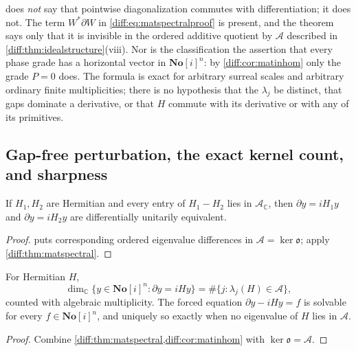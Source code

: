 \documentclass[11pt,letterpaper]{article}
\numberwithin{equation}{section}
\theoremstyle{definition}
\theoremstyle{remark}
\newcommand{\SC}{\mathbf{No}[i]}
\newcommand{\C}{\mathbb C}
\newcommand{\der}{\partial}
\newcommand{\Acl}{\mathcal A}
\newcommand{\Obs}{\mathfrak o}
\newcommand{\Ker}{\operatorname{ker}}
\begin{document}
\begin{warning}
\label{diff:warn:matconnection}
 does \emph{not} say that pointwise diagonalization
commutes with differentiation; it does not. The term $W^{*}\der W$ in
\cref{diff:eq:matspectralproof} is present, and the theorem says only that it
is invisible in the ordered additive quotient by $\Acl$ described in
\cref{diff:thm:idealstructure}(viii). Nor is the classification the assertion
that every phase grade has a horizontal vector in $\SC^{n}$: by
\cref{diff:cor:matinhom} only the grade $P=0$ does. The formula is exact for
arbitrary surreal scales and arbitrary ordinary finite multiplicities; there is
no hypothesis that the $\lambda_{j}$ be distinct, that gaps dominate a
derivative, or that $H$ commute with its derivative or with any of its
primitives.
\end{warning}

\subsection{Gap-free perturbation, the exact kernel count, and sharpness}
\label{diff:sub:matperturbation}

\begin{corollary}
\label{diff:cor:matperturbation}
If $H_{1},H_{2}$ are Hermitian and every entry of $H_{1}-H_{2}$ lies in
$\Acl_{\C}$, then $\der y=iH_{1}y$ and $\der y=iH_{2}y$ are differentially
unitarily equivalent.
\end{corollary}
\begin{proof}
 puts corresponding ordered eigenvalue differences in
$\Acl=\Ker\Obs$; apply \cref{diff:thm:matspectral}.
\end{proof}

\begin{corollary}
\label{diff:cor:matkernel}
For Hermitian $H$,
\begin{equation}\label{diff:eq:matkernelcount}
 \dim_{\C}\{y\in\SC^{n}:\der y=iHy\}
   =\#\{j:\lambda_{j}(H)\in\Acl\},
\end{equation}
counted with algebraic multiplicity. The forced equation $\der y-iHy=f$ is
solvable for every $f\in\SC^{n}$, and uniquely so exactly when no eigenvalue
of $H$ lies in $\Acl$.
\end{corollary}
\begin{proof}
Combine \cref{diff:thm:matspectral,diff:cor:matinhom} with
$\Ker\Obs=\Acl$.
\end{proof}
\end{document}
